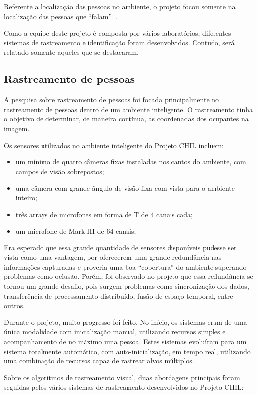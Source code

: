 Referente a localização das pessoas no ambiente, o projeto focou somente na localização das pessoas que ``falam''~\cite{speaker-localization}.

Como a equipe deste projeto é composta por vários laboratórios, diferentes sistemas de rastreamento e identificação foram desenvolvidos. Contudo, será relatado somente aqueles que se destacaram.

\subsection{Rastreamento de pessoas}

A pesquisa sobre rastreamento de pessoas foi focada principalmente no rastreamento de pessoas dentro de um ambiente inteligente. O rastreamento tinha o objetivo de determinar,  de maneira contínua, as coordenadas dos ocupantes na imagem.

Os sensores utilizados no ambiente inteligente do Projeto CHIL incluem:	
	\begin{itemize}
		\item um mínimo de quatro câmeras fixas instaladas nos cantos do ambiente, com campos de visão sobrepostos;
		\item uma câmera com grande ângulo de visão fixa com vista para o ambiente inteiro;
		\item três arrays de microfones em forma de T de 4 canais cada;
		\item um microfone de Mark III de 64 canais;
	\end{itemize}

Era esperado que essa grande quantidade de sensores disponíveis pudesse ser vista como uma vantagem, por oferecerem uma grande redundância nas informações capturadas e proveria uma boa ``cobertura'' do ambiente superando problemas como oclusão. Porém, foi observado no projeto que essa redundância se tornou um grande desafio, pois surgem problemas como sincronização dos dados, transferência de processamento distribuído, fusão de espaço-temporal, entre outros.

Durante o projeto, muito progresso foi feito. No início, os sistemas eram de uma única modalidade com inicialização manual, utilizando recursos simples e acompanhamento de no máximo uma pessoa. Estes sistemas evoluíram para um sistema totalmente automático, com auto-inicialização, em tempo real, utilizando uma combinação de recursos capaz de rastrear alvos múltiplos.

Sobre os algoritmos de rastreamento visual, duas abordagens principais foram seguidas pelos vários sistemas de rastreamento desenvolvidos no Projeto CHIL:

